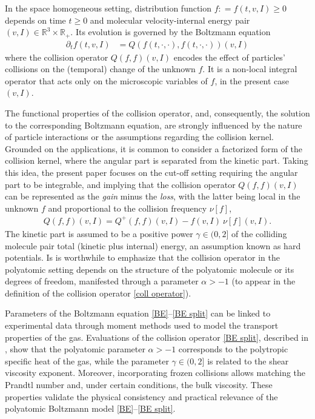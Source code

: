 \documentclass[11pt,a4paper]{amsart}
\newcommand{\bR}{\mathbb{R}^3}
\newcommand{\bRp}{\mathbb{R}_+}
\newcommand{\g}{\gamma}
\begin{document}
In the space homogeneous setting, distribution function $f: = f(t,v,I)\geq 0$   depends on time $t\geq 0$ and molecular velocity-internal energy pair $(v,I) \in \bR\times \bRp$. Its evolution is governed by the Boltzmann equation 
\begin{equation}\label{BE}
	\begin{split}
		\partial_t f(t,v,I) &= Q(f(t,\cdot,\cdot), f(t,\cdot,\cdot))(v,I)%
	\end{split}
\end{equation}
where   the  collision operator  $Q(f, f)(v,I)$  encodes the effect of particles' collisions on the (tempo\-ral) change of the unknown $f$.  It  is a non-local integral operator that acts only on the  microscopic variables of $f$, in the present case $(v,I)$. 

The functional properties of the collision operator,  and, consequently, the solution to the corresponding Boltzmann equation, are strongly influenced by the nature of particle interactions or the assumptions regarding the collision kernel.  Grounded on  the applications, it is common to consider a factorized form of the collision kernel, where the angular part is separated from the kinetic part. Taking this idea, the present paper focuses on the cut-off setting requiring the angular part to be integrable, and implying that the collision operator $Q(f, f)(v,I)$  can be  represented  as the \emph{gain} minus the \emph{loss}, with the latter  being  local in the unknown $f$ and proportional to the collision frequency $	\nu[f]$,
\begin{equation}\label{BE split}
	\begin{split}
		Q(f,f)(v,I) = Q^+(f, f)(v,I) - f(v,I) \	\nu[f](v,I).
	\end{split}
\end{equation}
The kinetic part is assumed to be  a positive power $  \g \in (0,2]$    of the colliding molecule pair total  (kinetic plus internal) energy, an assumption known as hard potentials. Is is worthwhile to emphasize that the collision operator in the polyatomic setting depends on the structure of the polyatomic molecule or its degrees of freedom, manifested through a parameter $\alpha>-1$ (to  appear in the definition of the collision operator \eqref{coll operator}).  

Parameters of the Boltzmann equation \eqref{BE}--\eqref{BE split} can be linked to experimental data through moment methods used to model the transport properties of the gas. Evaluations of the collision operator \eqref{BE split}, described in \cite{MPC-Dj-S,MPC-Dj-T,MPC-Dj-T-O,MPC-SS-non-poly}, show that the polyatomic parameter $\alpha>-1$ corresponds to the polytropic specific heat of the gas, while the parameter $\g\in (0,2]$ is related to the shear viscosity exponent. Moreover, incorporating frozen collisions   \cite{MC-Alonso-frozen} allows matching the Prandtl number and, under certain conditions, the bulk viscosity. These properties validate the physical consistency and practical relevance of the polyatomic Boltzmann model \eqref{BE}--\eqref{BE split}.
\end{document}
